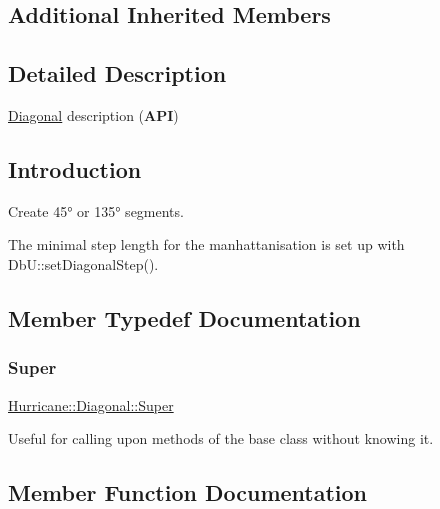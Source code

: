 \subsection*{Additional Inherited Members}


\subsection{Detailed Description}
\hyperlink{classHurricane_1_1Diagonal}{Diagonal} description ({\bfseries A\+PI}) 

\hypertarget{classHurricane_1_1Diagonal_secDiagonalIntro}{}\subsection{Introduction}\label{classHurricane_1_1Diagonal_secDiagonalIntro}
Create 45° or 135° segments.

The minimal step length for the manhattanisation is set up with Db\+U\+::set\+Diagonal\+Step(). 

\subsection{Member Typedef Documentation}
\mbox{\label{classHurricane_1_1Diagonal_aef5120a04b3b4db78b118e8c5daade90}} 
\subsubsection{\texorpdfstring{Super}{Super}}
{\footnotesize\ttfamily \hyperlink{classHurricane_1_1Diagonal_aef5120a04b3b4db78b118e8c5daade90}{Hurricane\+::\+Diagonal\+::\+Super}}

Useful for calling upon methods of the base class without knowing it. 

\subsection{Member Function Documentation}
\mbox{\label{classHurricane_1_1Diagonal_a83cd4332e78515e2c3745fd017e7441f}} 
